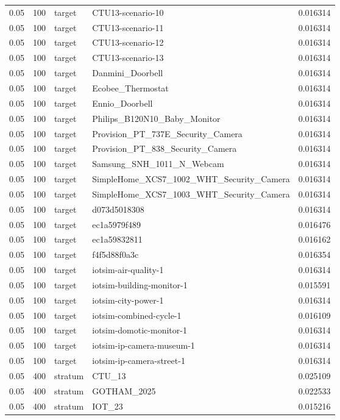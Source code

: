 \begin{tabular}{lllll}
0.05 & 100 & target & CTU13-scenario-10 & 0.016314 \\
0.05 & 100 & target & CTU13-scenario-11 & 0.016314 \\
0.05 & 100 & target & CTU13-scenario-12 & 0.016314 \\
0.05 & 100 & target & CTU13-scenario-13 & 0.016314 \\
0.05 & 100 & target & Danmini\_Doorbell & 0.016314 \\
0.05 & 100 & target & Ecobee\_Thermostat & 0.016314 \\
0.05 & 100 & target & Ennio\_Doorbell & 0.016314 \\
0.05 & 100 & target & Philips\_B120N10\_Baby\_Monitor & 0.016314 \\
0.05 & 100 & target & Provision\_PT\_737E\_Security\_Camera & 0.016314 \\
0.05 & 100 & target & Provision\_PT\_838\_Security\_Camera & 0.016314 \\
0.05 & 100 & target & Samsung\_SNH\_1011\_N\_Webcam & 0.016314 \\
0.05 & 100 & target & SimpleHome\_XCS7\_1002\_WHT\_Security\_Camera & 0.016314 \\
0.05 & 100 & target & SimpleHome\_XCS7\_1003\_WHT\_Security\_Camera & 0.016314 \\
0.05 & 100 & target & d073d5018308 & 0.016314 \\
0.05 & 100 & target & ec1a5979f489 & 0.016476 \\
0.05 & 100 & target & ec1a59832811 & 0.016162 \\
0.05 & 100 & target & f4f5d88f0a3c & 0.016354 \\
0.05 & 100 & target & iotsim-air-quality-1 & 0.016314 \\
0.05 & 100 & target & iotsim-building-monitor-1 & 0.015591 \\
0.05 & 100 & target & iotsim-city-power-1 & 0.016314 \\
0.05 & 100 & target & iotsim-combined-cycle-1 & 0.016109 \\
0.05 & 100 & target & iotsim-domotic-monitor-1 & 0.016314 \\
0.05 & 100 & target & iotsim-ip-camera-museum-1 & 0.016314 \\
0.05 & 100 & target & iotsim-ip-camera-street-1 & 0.016314 \\
0.05 & 400 & stratum & CTU\_13 & 0.025109 \\
0.05 & 400 & stratum & GOTHAM\_2025 & 0.022533 \\
0.05 & 400 & stratum & IOT\_23 & 0.015216 \\

\end{tabular}
